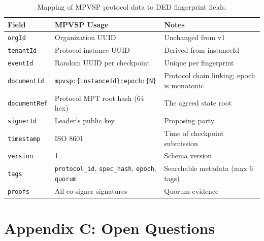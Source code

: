 \documentclass[11pt,a4paper]{article}
\begin{document}
\begin{table}[H]
\centering
\begin{tabularx}{\textwidth}{llX}
\toprule
\textbf{Field} & \textbf{MPVSP Usage} & \textbf{Notes} \\
\midrule
\texttt{orgId} & Organization UUID & Unchanged from v1 \\
\texttt{tenantId} & Protocol instance UUID & Derived from instanceId \\
\texttt{eventId} & Random UUID per checkpoint & Unique per fingerprint \\
\texttt{documentId} & \texttt{mpvsp:\{instanceId\}:epoch:\{N\}} & Protocol chain
  linking; epoch is monotonic \\
\texttt{documentRef} & Protocol MPT root hash (64 hex) & The agreed state root \\
\texttt{signerId} & Leader's public key & Proposing party \\
\texttt{timestamp} & ISO 8601 & Time of checkpoint submission \\
\texttt{version} & 1 & Schema version \\
\texttt{tags} & \texttt{protocol\_id}, \texttt{spec\_hash}, \texttt{epoch},
  \texttt{quorum} & Searchable metadata (max 6 tags) \\
\texttt{proofs} & All co-signer signatures & Quorum evidence \\
\bottomrule
\end{tabularx}
\caption{Mapping of MPVSP protocol data to DED fingerprint fields.}
\label{tab:encoding}
\end{table}


\section*{Appendix C: Open Questions}
\end{document}
